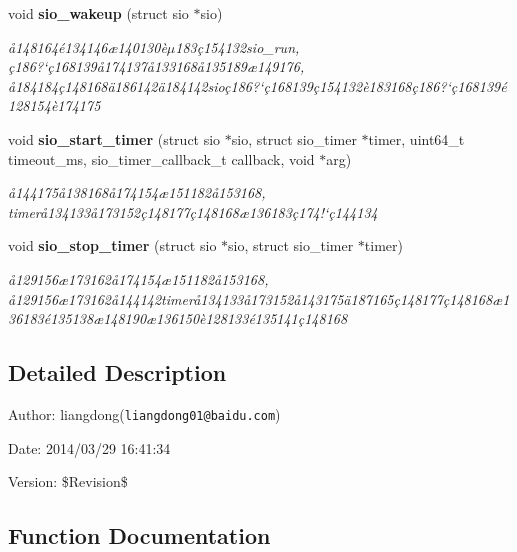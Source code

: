 \begin{CompactItemize}
void {\bf sio\_\-wakeup} (struct sio $\ast$sio)
\begin{CompactList}\small\item\em \aa{}148164\'{e}134146\ae{}140130\`{e}$\mu$183\c{c}154132sio\_\-run, \c{c}186?`\c{c}168139\aa{}174137\aa{}133168\aa{}135189\ae{}149176, \aa{}184184\c{c}148168\"{a}186142\"{a}184142sio\c{c}186?`\c{c}168139\c{c}154132\`{e}183168\c{c}186?`\c{c}168139\'{e}128154\`{e}174175 \item\end{CompactList}\item 
void {\bf sio\_\-start\_\-timer} (struct sio $\ast$sio, struct sio\_\-timer $\ast$timer, uint64\_\-t timeout\_\-ms, sio\_\-timer\_\-callback\_\-t callback, void $\ast$arg)
\begin{CompactList}\small\item\em \aa{}144175\aa{}138168\aa{}174154\ae{}151182\aa{}153168, timer\aa{}134133\aa{}173152\c{c}148177\c{c}148168\ae{}136183\c{c}174!`\c{c}144134 \item\end{CompactList}\item 
void {\bf sio\_\-stop\_\-timer} (struct sio $\ast$sio, struct sio\_\-timer $\ast$timer)
\begin{CompactList}\small\item\em \aa{}129156\ae{}173162\aa{}174154\ae{}151182\aa{}153168, \aa{}129156\ae{}173162\aa{}144142timer\aa{}134133\aa{}173152\aa{}143175\"{a}187165\c{c}148177\c{c}148168\ae{}136183\'{e}135138\ae{}148190\ae{}136150\`{e}128133\'{e}135141\c{c}148168 \item\end{CompactList}\end{CompactItemize}


\subsection{Detailed Description}
\begin{Desc}
\item[Author:]liangdong({\tt liangdong01@baidu.com}) \end{Desc}
\begin{Desc}
\item[Date:]2014/03/29 16:41:34 \end{Desc}
\begin{Desc}
\item[Version:]\$Revision\$ \end{Desc}


\subsection{Function Documentation}

